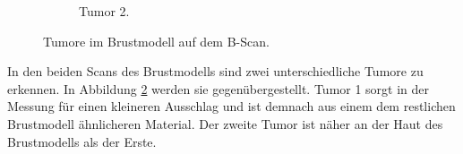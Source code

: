 \begin{figure}
\begin{subfigure}{0.48\textwidth}
        \caption{Tumor 2.}%
        \label{fig:tumor_2}%
    \end{subfigure}%
    \caption{Tumore im Brustmodell auf dem B-Scan.}%
    \label{fig:tumore}
\end{figure}%

In den beiden Scans des Brustmodells sind zwei unterschiedliche Tumore zu erkennen.
In Abbildung \ref{fig:tumore} werden sie gegenübergestellt.
Tumor 1 sorgt in der Messung für einen kleineren Ausschlag und ist demnach aus einem dem restlichen Brustmodell ähnlicheren Material.
Der zweite Tumor ist näher an der Haut des Brustmodells als der Erste.